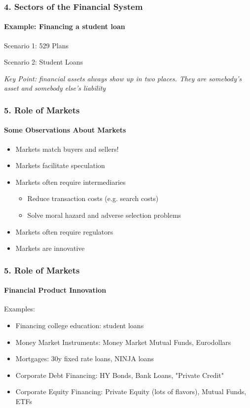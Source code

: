 \documentclass{beamer}
\begin{document}
\begin{frame}[t]
    \frametitle{4. Sectors of the Financial System}
    \framesubtitle{Example: Financing a student loan}
    Scenario 1: 529 Plans\\

    \vspace{4em}
    
    Scenario 2: Student Loans\\
    
    \vspace{4em}
    
    \textit{Key Point: financial assets always show up in two places.  They are somebody's asset and somebody else's liability}
\end{frame}


\begin{frame}[t]
    \frametitle{5. Role of Markets}
    \framesubtitle{Some Observations About Markets}
    \begin{itemize}
        \item Markets match buyers and sellers!
        \item Markets facilitate speculation
        \item Markets often require intermediaries
        \begin{itemize}
            \item Reduce transaction costs (e.g. search costs)
            \item Solve moral hazard and adverse selection problems 
        \end{itemize}
        \item Markets often require regulators
        \item Markets are innovative
    \end{itemize}
\end{frame}


\begin{frame}[t]
    \frametitle{5. Role of Markets}
    \framesubtitle{Financial Product Innovation}
    Examples:
    \begin{itemize}
        \item Financing college education: student loans
        \item Money Market Instruments: Money Market Mutual Funds, Eurodollars
        \item Mortgages: 30y fixed rate loans, NINJA loans
        \item Corporate Debt Financing: HY Bonds, Bank Loans, "Private Credit" 
        \item Corporate Equity Financing: Private Equity (lots of flavors), Mutual Funds, ETFs
    \end{itemize}
\end{frame}
\end{document}

